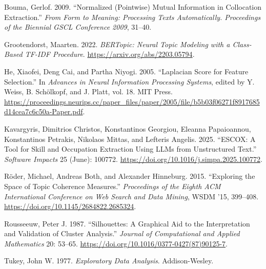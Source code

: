 \documentclass[
  letterpaper,
  DIV=11,
  numbers=noendperiod,
  sfdefaults=false]{scrartcl}
\newlength{\cslhangindent}
\newenvironment{CSLReferences}[2] %
 {\begin{list}{}{%
  \setlength{\itemindent}{0pt}
  \setlength{\leftmargin}{0pt}
  \setlength{\parsep}{0pt}
  \ifodd #1
   \setlength{\leftmargin}{\cslhangindent}
   \setlength{\itemindent}{-1\cslhangindent}
  \fi
  \setlength{\itemsep}{#2\baselineskip}}}
 {\end{list}}
\begin{document}
\protect{}\label{refs}
\begin{CSLReferences}{1}{1}
Bouma, Gerlof. 2009. {``Normalized (Pointwise) Mutual Information in
Collocation Extraction.''} \emph{From Form to Meaning: Processing Texts
Automatically. Proceedings of the Biennial GSCL Conference 2009},
31--40.

Grootendorst, Maarten. 2022. \emph{{BERTopic}: Neural Topic Modeling
with a Class-Based {TF-IDF} Procedure}.
\url{https://arxiv.org/abs/2203.05794}.

He, Xiaofei, Deng Cai, and Partha Niyogi. 2005. {``Laplacian Score for
Feature Selection.''} In \emph{Advances in Neural Information Processing
Systems}, edited by Y. Weiss, B. Schölkopf, and J. Platt, vol. 18. MIT
Press.
\url{https://proceedings.neurips.cc/paper_files/paper/2005/file/b5b03f06271f8917685d14cea7c6c50a-Paper.pdf}.

Kavargyris, Dimitrios Christos, Konstantinos Georgiou, Eleanna
Papaioannou, Konstantinos Petrakis, Nikolaos Mittas, and Lefteris
Angelis. 2025. {``ESCOX: A Tool for Skill and Occupation Extraction
Using LLMs from Unstructured Text.''} \emph{Software Impacts} 25 (June):
100772. \url{https://doi.org/10.1016/j.simpa.2025.100772}.

Röder, Michael, Andreas Both, and Alexander Hinneburg. 2015.
{``Exploring the Space of Topic Coherence Measures.''} \emph{Proceedings
of the Eighth ACM International Conference on Web Search and Data
Mining}, WSDM '15, 399--408.
\url{https://doi.org/10.1145/2684822.2685324}.

Rousseeuw, Peter J. 1987. {``Silhouettes: A Graphical Aid to the
Interpretation and Validation of Cluster Analysis.''} \emph{Journal of
Computational and Applied Mathematics} 20: 53--65.
\url{https://doi.org/10.1016/0377-0427(87)90125-7}.

Tukey, John W. 1977. \emph{Exploratory Data Analysis}. Addison-Wesley.

\end{CSLReferences}
\end{document}
